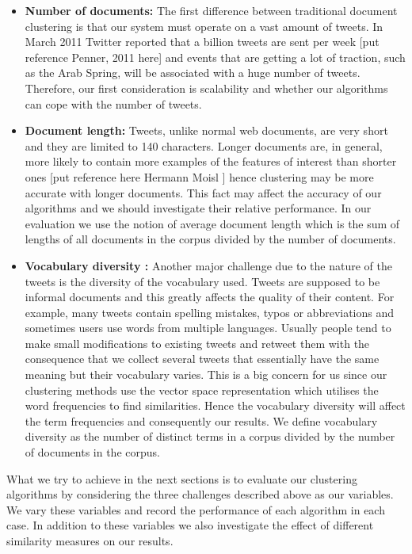 \begin{itemize}
   \item \textbf{Number of documents:} The first difference between traditional document clustering is that our system must operate on a vast amount 
   of tweets. In March 2011 Twitter reported that a billion tweets are sent per week [put reference Penner, 2011 here] and events that are getting a lot 
   of traction, such as the Arab Spring, will be associated with a huge number of tweets. Therefore, our first consideration is scalability and whether our algorithms can cope with the 
   number of tweets.    
   \item \textbf{Document length:} Tweets, unlike normal web documents, are very short and they are limited to 140 characters. Longer documents are, in general, more likely
  to contain more examples of the features of interest than shorter ones [put reference here Hermann Moisl ] hence clustering may be more accurate with longer documents. This fact may 
  affect the accuracy of our algorithms and we should investigate their relative performance. In our evaluation we use the notion of average document length which is the sum of lengths of all documents 
  in the corpus divided by the number of documents. 
   \item \textbf{Vocabulary diversity :} Another major challenge due to the nature of the tweets is the diversity of the vocabulary used. Tweets are supposed to be informal documents
   and this greatly affects the quality of their content. For example, many tweets contain spelling mistakes, typos or abbreviations and sometimes users use words from multiple languages.
   Usually people tend to make small modifications to existing tweets and retweet them with the consequence that we collect several tweets that essentially have the same meaning but their
   vocabulary varies. This is a big concern for us since our clustering methods use the vector space representation which utilises the word frequencies to find similarities. Hence the vocabulary 
   diversity will affect the term frequencies and consequently our results. We define vocabulary diversity as the number of distinct terms in a corpus divided by the number of documents in the corpus.
\end{itemize} 
What we try to achieve in the next sections is to evaluate our clustering algorithms by considering the three challenges described above as our variables. We vary these variables and 
record the performance of each algorithm in each case. In addition to these variables we also investigate the effect of different similarity measures on our results. 

